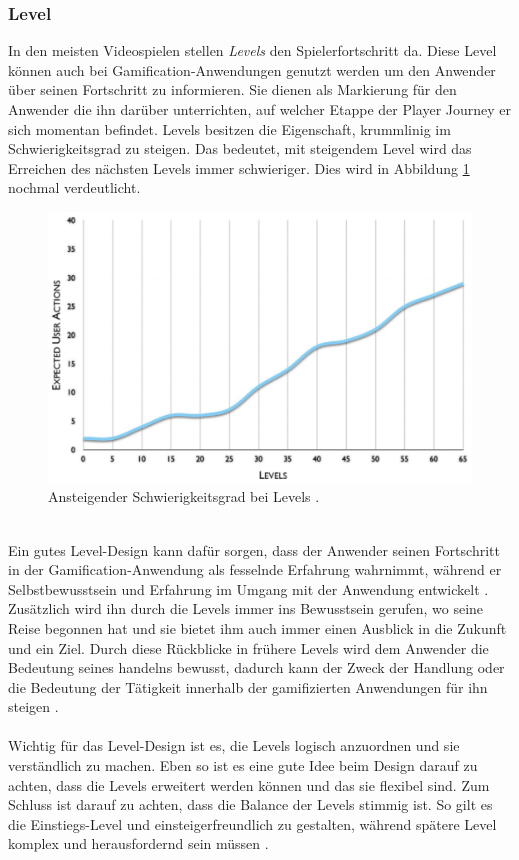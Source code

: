 \documentclass[a4paper,12pt]{scrartcl}
\begin{document}
\subsubsection{Level}
In den meisten Videospielen stellen \textit{Levels} den Spielerfortschritt da. Diese Level können auch bei Gamification-Anwendungen genutzt werden um den Anwender über seinen Fortschritt zu informieren. Sie dienen als Markierung für den Anwender die ihn darüber unterrichten, auf welcher Etappe der Player Journey er sich momentan befindet. Levels besitzen die Eigenschaft, krummlinig im Schwierigkeitsgrad zu steigen. Das bedeutet, mit steigendem Level wird das Erreichen des nächsten Levels immer schwieriger. Dies wird in Abbildung \ref{LevelkomplexitätBild} nochmal verdeutlicht.
\\
\begin{figure}[h!]
\begin{center}
\includegraphics[scale = 0.7]{Bilder/Levels.eps}
\caption{Ansteigender Schwierigkeitsgrad bei Levels \cite{Zichermann2011}.}
\label{LevelkomplexitätBild}
\end{center}
\end{figure} 
\\
Ein gutes Level-Design kann dafür sorgen, dass der Anwender seinen Fortschritt in der Gamification-Anwendung als fesselnde Erfahrung wahrnimmt, während er Selbstbewusstsein und Erfahrung im Umgang mit der Anwendung entwickelt \cite{Zichermann2011}. Zusätzlich wird ihn durch die Levels immer ins Bewusstsein gerufen, wo seine Reise begonnen hat und sie bietet ihm auch immer einen Ausblick in die Zukunft und ein Ziel. Durch diese Rückblicke in frühere Levels wird dem Anwender die Bedeutung seines handelns bewusst, dadurch kann der Zweck der Handlung oder die Bedeutung der Tätigkeit innerhalb der gamifizierten Anwendungen für ihn steigen \cite{Zichermann2011}.
\\\\
Wichtig für das Level-Design ist es, die Levels logisch anzuordnen und sie verständlich zu machen. Eben so ist es eine gute Idee beim Design darauf zu achten, dass die Levels erweitert werden können und das sie flexibel sind. Zum Schluss ist darauf zu achten, dass die Balance der Levels stimmig ist. So gilt es die Einstiegs-Level und einsteigerfreundlich zu gestalten, während spätere Level komplex und herausfordernd sein müssen \cite{Zichermann2011}.
\end{document}
